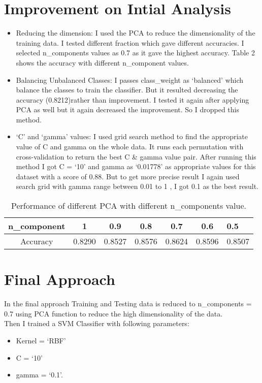 \documentclass[a4paper, 11pt]{article}
\begin{document}
\section*{Improvement on Intial Analysis}
\begin{itemize}
	\item Reducing the dimension: I used the PCA to reduce the dimensionality of the training data. I tested different fraction which gave different accuracies. I selected n\_components values as 0.7 as it gave the highest accuracy. Table 2 shows the accuracy with different n\_component values.
	\item Balancing Unbalanced Classes: I passes class\_weight as `balanced' which balance the classes to train the classifier. But it resulted decreasing the accuracy (0.8212)rather than improvement. I tested it again after applying PCA as well but it again decreased the improvement. So I dropped this method.
	\item `C' and `gamma' values: I used grid search method to find the appropriate value of C and gamma on the whole data. It runs each permutation with cross-validation to return the best C \& gamma value pair. After running this method I got C = `10' and gamma as `0.01778' as appropriate values for this dataset with a score of 0.88. But to get more precise result I again used search grid with gamma range between 0.01 to 1 , I got 0.1 as the best result.
\end{itemize}
\begin{table}
	\centering
	\caption{Performance of different PCA with different n\_components value.}
	\begin{tabular}{|c|c|c|c|c|c|l|} \hline
		n\_component&1&0.9&0.8&0.7&0.6&0.5\\ \hline
		Accuracy&0.8290&0.8527&0.8576&0.8624&0.8596&0.8507\\ \hline
	\end{tabular}
\end{table}
\section*{Final Approach}
In the final approach Training and Testing data is reduced to n\_components = 0.7 using PCA function to reduce the high dimensionality of the data. \\
Then I trained a SVM Classifier with following parameters:
\begin{itemize}
	\item Kernel = `RBF'
	\item C = `10'
	\item gamma = `0.1'.
\end{itemize}
\end{document}
